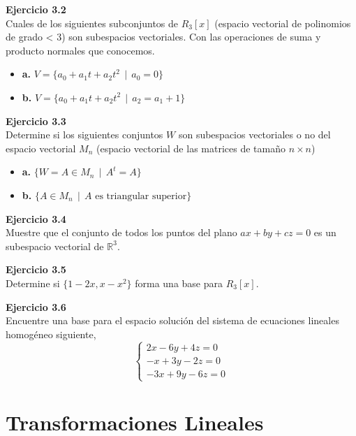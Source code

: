 \documentclass{article}
\newenvironment{problem}[2][Ejercicio]
    { \begin{mdframed}[backgroundcolor=gray!20] \textbf{#1 #2} \\}
    {  \end{mdframed}}
\begin{document}
\begin{problem}{3.2}
    Cuales de los siguientes subconjuntos de $R_3[x]$ (espacio vectorial de polinomios de grado < 3) son subespacios vectoriales. Con las operaciones de suma y producto normales que conocemos.
\begin{itemize}
\item 
\textbf{a.} $V = \{ a_0 + a_1t + a_2t^2 \ \ | \ \ a_0 = 0 \}$
\item 
\textbf{b.} $V = \{ a_0 + a_1t + a_2t^2 \ \ | \ \ a_2 = a_1 + 1 \}$
\end{itemize}
\end{problem}

\begin{problem}{3.3}
    Determine si los siguientes conjuntos $W$ son subespacios vectoriales o no del espacio vectorial $M_n$ (espacio vectorial de las matrices de tamaño $n \times n$)
\begin{itemize}
\item 
\textbf{a.} $\{ W = A \in M_n \ \ | \  \ A^t = A \}$
\item 
\textbf{b.} $\{ A \in M_n \ \ | \ \ A \text{ es triangular superior} \}$
\end{itemize}
\end{problem}

\begin{problem}{3.4}
    Muestre que el conjunto de todos los puntos del plano $ax +by +cz = 0$ es un subespacio vectorial de $\mathbb{R}^3$.
\end{problem}
\begin{problem}{3.5}
    Determine si $\{ 1 - 2x, x - x^2\}$ forma una base para $R_3[x]$.
\end{problem}
\newpage
\begin{problem}{3.6}
    Encuentre una base para el espacio solución del sistema de ecuaciones lineales homogéneo siguiente,
\[
\begin{cases}
2x-6y+4z = 0 \\
-x+3y-2z = 0 \\
-3x+9y-6z = 0
\end{cases}
\]
\end{problem}

\section{Transformaciones Lineales}\label{sec:trans-lineales}
\end{document}
